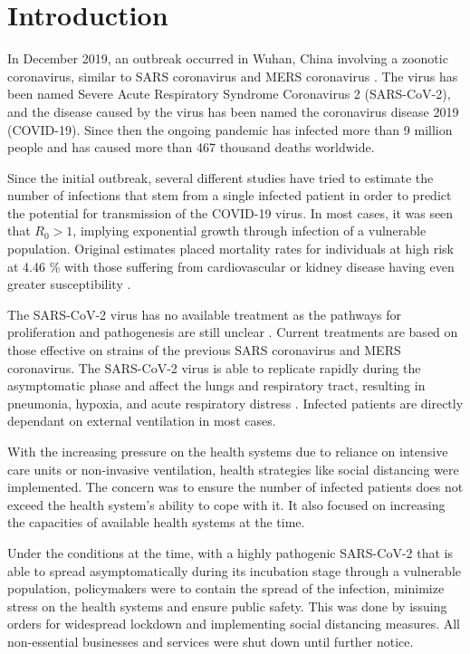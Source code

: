 \documentclass[preprint,authoryear,12pt]{elsarticle}
\begin{document}
	
\section{Introduction}
	\label{SEC1}
	In December 2019, an outbreak occurred in Wuhan, China involving a zoonotic coronavirus, similar to SARS coronavirus and MERS coronavirus  \cite{taaa021}. The virus has been named Severe Acute Respiratory Syndrome Coronavirus 2 (SARS-CoV-2), and the disease caused by the virus has been named the coronavirus disease 2019 (COVID-19). Since then the ongoing pandemic has infected more than 9 million people and has caused more than 467 thousand deaths worldwide.
	
	Since the initial outbreak, several different studies have tried to estimate the number of infections \cite{GN2020} that stem from a single infected patient in order to predict the potential for transmission of the COVID-19 virus. In most cases, it was seen that $R_0 > 1$, implying exponential growth through infection of a vulnerable population. Original estimates placed mortality rates for individuals at high risk at  4.46 \% with those suffering from cardiovascular or kidney disease having even greater susceptibility \cite{BPH2020}. 
	
	The SARS-CoV-2 virus has no available treatment as the pathways for proliferation and pathogenesis are still unclear \cite{RIS2020}.  Current treatments are based on those effective on strains of the previous SARS coronavirus and MERS coronavirus. The SARS-CoV-2  virus is able to replicate rapidly during the asymptomatic phase and affect the lungs and respiratory tract, resulting in pneumonia, hypoxia, and acute respiratory distress \cite{PSL2020}. Infected patients are directly dependant on external ventilation in most cases. 
	
	
	With the increasing pressure on the health systems due to reliance on intensive care units or non-invasive ventilation, health strategies like social distancing were implemented. The concern was to ensure the number of infected patients does not exceed the health system’s ability to cope with it. It also focused on increasing the capacities of available health systems at the time.
	
	
	Under the conditions at the time, with a highly pathogenic SARS-CoV-2 that is able to spread asymptomatically during its incubation stage through a vulnerable population, policymakers were to contain the spread of the infection, minimize stress on the health systems and ensure public safety. This was done by issuing orders for widespread lockdown and implementing social distancing measures. All non-essential businesses and services were shut down until further notice. 
	
\end{document}

